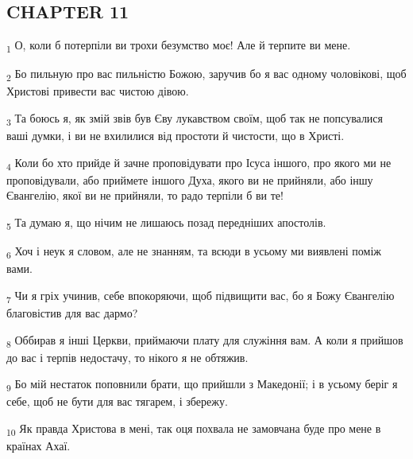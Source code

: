 \subsection{CHAPTER 11}
\begin{tcolorbox}
\textsubscript{1} О, коли б потерпіли ви трохи безумство моє! Але й терпите ви мене.
\end{tcolorbox}
\begin{tcolorbox}
\textsubscript{2} Бо пильную про вас пильністю Божою, заручив бо я вас одному чоловікові, щоб Христові привести вас чистою дівою.
\end{tcolorbox}
\begin{tcolorbox}
\textsubscript{3} Та боюсь я, як змій звів був Єву лукавством своїм, щоб так не попсувалися ваші думки, і ви не вхилилися від простоти й чистости, що в Христі.
\end{tcolorbox}
\begin{tcolorbox}
\textsubscript{4} Коли бо хто прийде й зачне проповідувати про Ісуса іншого, про якого ми не проповідували, або приймете іншого Духа, якого ви не прийняли, або іншу Євангелію, якої ви не прийняли, то радо терпіли б ви те!
\end{tcolorbox}
\begin{tcolorbox}
\textsubscript{5} Та думаю я, що нічим не лишаюсь позад передніших апостолів.
\end{tcolorbox}
\begin{tcolorbox}
\textsubscript{6} Хоч і неук я словом, але не знанням, та всюди в усьому ми виявлені поміж вами.
\end{tcolorbox}
\begin{tcolorbox}
\textsubscript{7} Чи я гріх учинив, себе впокоряючи, щоб підвищити вас, бо я Божу Євангелію благовістив для вас дармо?
\end{tcolorbox}
\begin{tcolorbox}
\textsubscript{8} Оббирав я інші Церкви, приймаючи плату для служіння вам. А коли я прийшов до вас і терпів недостачу, то нікого я не обтяжив.
\end{tcolorbox}
\begin{tcolorbox}
\textsubscript{9} Бо мій нестаток поповнили брати, що прийшли з Македонії; і в усьому беріг я себе, щоб не бути для вас тягарем, і збережу.
\end{tcolorbox}
\begin{tcolorbox}
\textsubscript{10} Як правда Христова в мені, так оця похвала не замовчана буде про мене в країнах Ахаї.
\end{tcolorbox}

